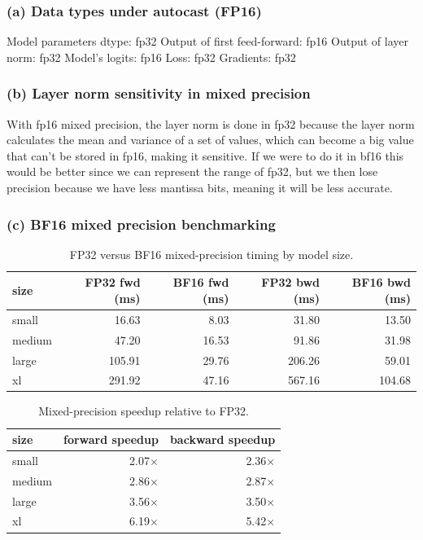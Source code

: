 \documentclass[11pt]{article}
\begin{document}
\subsubsection*{(a) Data types under autocast (FP16)}

Model parameters dtype: fp32
Output of first feed-forward: fp16
Output of layer norm: fp32
Model's logits: fp16
Loss: fp32
Gradients: fp32

\subsubsection*{(b) Layer norm sensitivity in mixed precision}

With fp16 mixed precision, the layer norm is done in fp32 because the layer norm calculates the mean and variance of a set of values, which can become a big value that can't be stored in fp16, making it sensitive.
If we were to do it in bf16 this would be better since we can represent the range of fp32, but we then lose precision because we have less mantissa bits, meaning it will be less accurate.
\subsubsection*{(c) BF16 mixed precision benchmarking}

\begin{table}[H]
\centering
\small
\caption{FP32 versus BF16 mixed-precision timing by model size.}
\setlength{\tabcolsep}{4pt}
\begin{tabular}{lrrrr}
\toprule
size & FP32 fwd (ms) & BF16 fwd (ms) & FP32 bwd (ms) & BF16 bwd (ms) \\
\midrule
small & 16.63 & 8.03 & 31.80 & 13.50 \\
medium & 47.20 & 16.53 & 91.86 & 31.98 \\
large & 105.91 & 29.76 & 206.26 & 59.01 \\
xl & 291.92 & 47.16 & 567.16 & 104.68 \\
\bottomrule
\end{tabular}
\end{table}

\begin{table}[H]
\centering
\caption{Mixed-precision speedup relative to FP32.}
\begin{tabular}{lrr}
\toprule
size & forward speedup & backward speedup \\
\midrule
small & 2.07$\times$ & 2.36$\times$ \\
medium & 2.86$\times$ & 2.87$\times$ \\
large & 3.56$\times$ & 3.50$\times$ \\
xl & 6.19$\times$ & 5.42$\times$ \\
\bottomrule
\end{tabular}
\end{table}
\end{document}
